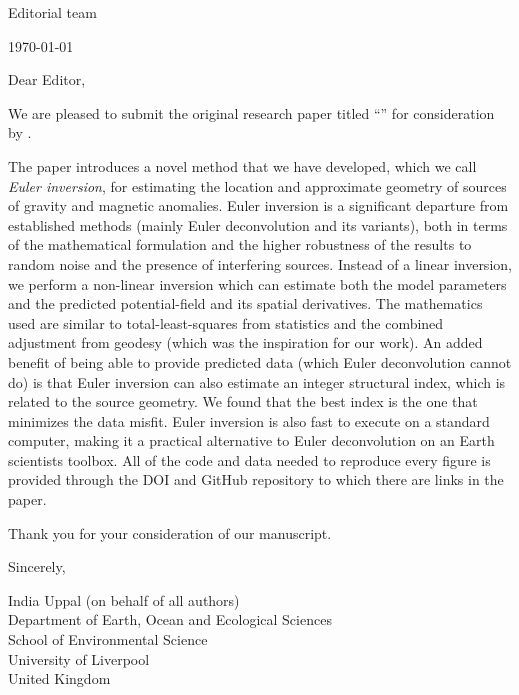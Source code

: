 \documentclass[a4paper,onecolumn,10pt]{article}
\newcommand{\Padding}{\vspace{0.5cm}}
\begin{document}
\begin{flushleft}
    Editorial team
    \\
    \Journal
\end{flushleft}
\begin{flushright}
  \today
\end{flushright}
\Padding

\noindent
Dear Editor,
\Padding

We are pleased to submit the original research paper titled ``\Title{}'' for
consideration by \Journal{}.

The paper introduces a novel method that we have developed, which we call
\textit{Euler inversion}, for estimating the location and approximate geometry
of sources of gravity and magnetic anomalies.
Euler inversion is a significant departure from established methods (mainly
Euler deconvolution and its variants), both in terms of the mathematical
formulation and the higher robustness of the results to random noise and the
presence of interfering sources.
Instead of a linear inversion, we perform a non-linear inversion which can
estimate both the model parameters and the predicted potential-field and its
spatial derivatives.
The mathematics used are similar to total-least-squares from statistics and the
combined adjustment from geodesy (which was the inspiration for our work).
An added benefit of being able to provide predicted data (which Euler
deconvolution cannot do) is that Euler inversion can also estimate an integer
structural index, which is related to the source geometry.
We found that the best index is the one that minimizes the data misfit.
Euler inversion is also fast to execute on a standard computer, making it
a practical alternative to Euler deconvolution on an Earth scientists toolbox.
All of the code and data needed to reproduce every figure is provided through
the DOI and GitHub repository to which there are links in the paper.

Thank you for your consideration of our manuscript.
\Padding

\begin{flushleft}
  Sincerely,
  \Padding

  India Uppal (on behalf of all authors)
  \\[0.25cm]
  {
    \color{mediumgray}
    \small
    Department of Earth, Ocean and Ecological Sciences
    \\
    School of Environmental Science
    \\
    University of Liverpool
    \\
    United Kingdom
  }
\end{flushleft}
\end{document}
